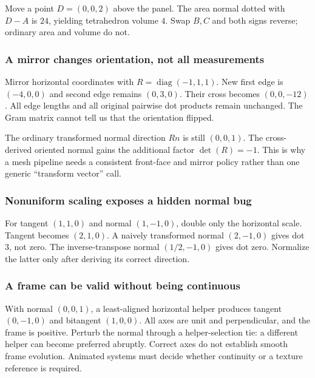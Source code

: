 Move a point \(D=(0,0,2)\) above the panel. The area normal dotted with \(D-A\) is \(24\), yielding tetrahedron volume \(4\). Swap \(B,C\) and both signs reverse; ordinary area and volume do not.

\subsubsection{A mirror changes orientation, not all measurements}\label{appendix-92ff77d4dfdc-a-mirror-changes-orientation-not-all-measurements}

Mirror horizontal coordinates with \(R=\operatorname{diag}(-1,1,1)\). New first edge is \((-4,0,0)\) and second edge remains \((0,3,0)\). Their cross becomes \((0,0,-12)\). All edge lengths and all original pairwise dot products remain unchanged. The Gram matrix cannot tell us that the orientation flipped.

The ordinary transformed normal direction \(Rn\) is still \((0,0,1)\). The cross-derived oriented normal gains the additional factor \(\det(R)=-1\). This is why a mesh pipeline needs a consistent front-face and mirror policy rather than one generic ``transform vector'' call.

\subsubsection{Nonuniform scaling exposes a hidden normal bug}\label{appendix-92ff77d4dfdc-nonuniform-scaling-exposes-a-hidden-normal-bug}

For tangent \((1,1,0)\) and normal \((1,-1,0)\), double only the horizontal scale. Tangent becomes \((2,1,0)\). A naively transformed normal \((2,-1,0)\) gives dot \(3\), not zero. The inverse-transpose normal \((1/2,-1,0)\) gives dot zero. Normalize the latter only after deriving its correct direction.

\subsubsection{A frame can be valid without being continuous}\label{appendix-92ff77d4dfdc-a-frame-can-be-valid-without-being-continuous}

With normal \((0,0,1)\), a least-aligned horizontal helper produces tangent \((0,-1,0)\) and bitangent \((1,0,0)\). All axes are unit and perpendicular, and the frame is positive. Perturb the normal through a helper-selection tie: a different helper can become preferred abruptly. Correct axes do not establish smooth frame evolution. Animated systems must decide whether continuity or a texture reference is required.

